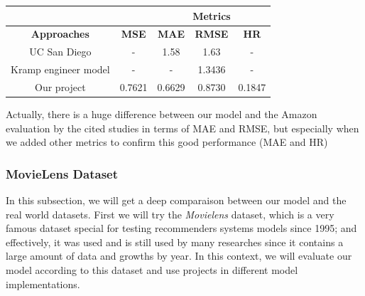 \documentclass{cup-pan}
\begin{document}
\begin{center} 
  \begin{tabular}{||c||c|c|c|c||}
    \hline\hline 
    \textbf{} & \multicolumn{1}{c}{\textbf{}} & \multicolumn{3}{c||}{\hspace{-1.5cm}\textbf{Metrics}} \\
    \hline\hline 
    \multicolumn{1}{||c||}{\textbf{Approaches}} & \textbf{MSE} & \textbf{MAE} & \textbf{RMSE} & \textbf{HR} \\
    \hline 
    UC San Diego & - & 1.58 & 1.63 & - \\
    Kramp engineer model & - & - & 1.3436 & - \\
    Our project & 0.7621 & 0.6629 & 0.8730 & 0.1847 \\
    \hline\hline
  \end{tabular}
\end{center}

Actually, there is a huge difference between our model and the Amazon evaluation by the cited studies in terms of MAE and RMSE, but especially when we added other metrics to confirm this good performance (MAE and HR)

\subsubsection{MovieLens Dataset}
In this subsection, we will get a deep comparaison between our model and the real world datasets. First we will try the \textit{Movielens} dataset, which is a very famous dataset special for testing recommenders systems models since 1995; and effectively, it was used and is still used by many researches since it contains a large amount of data and growths by year. In this context, we will evaluate our model according to this dataset and use projects in different model implementations.
\end{document}
